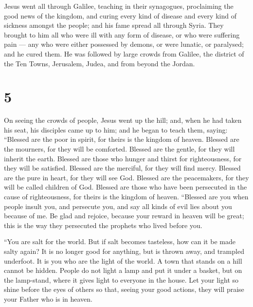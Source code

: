  Jesus went all through Galilee, teaching in their
synagogues, proclaiming the good news of the kingdom, and curing every
kind of disease and every kind of sickness amongst the people;
 and his fame spread all through Syria. They brought to him
all who were ill with any form of disease, or who were suffering pain
--- any who were either possessed by demons, or were lunatic, or
paralysed; and he cured them.  He was followed by large
crowds from Galilee, the district of the Ten Towns, Jerusalem, Judea,
and from beyond the Jordan.

\hypertarget{section-4}{%
\section{5}\label{section-4}}

 On seeing the crowds of people, Jesus went up the hill;
and, when he had taken his seat, his disciples came up to him;
 and he began to teach them, saying:  ``Blessed
are the poor in spirit, for theirs is the kingdom of heaven.
 Blessed are the mourners, for they will be comforted.
 Blessed are the gentle, for they will inherit the earth.
 Blessed are those who hunger and thirst for righteousness,
for they will be satisfied.  Blessed are the merciful, for
they will find mercy.  Blessed are the pure in heart, for
they will see God.  Blessed are the peacemakers, for they
will be called children of God.  Blessed are those who have
been persecuted in the cause of righteousness, for theirs is the kingdom
of heaven.  ``Blessed are you when people insult you, and
persecute you, and say all kinds of evil lies about you because of me.
 Be glad and rejoice, because your reward in heaven will be
great; this is the way they persecuted the prophets who lived before
you.

 ``You are salt for the world. But if salt becomes
tasteless, how can it be made salty again? It is no longer good for
anything, but is thrown away, and trampled underfoot.  It
is you who are the light of the world. A town that stands on a hill
cannot be hidden.  People do not light a lamp and put it
under a basket, but on the lamp-stand, where it gives light to everyone
in the house.  Let your light so shine before the eyes of
others so that, seeing your good actions, they will praise your Father
who is in heaven.

